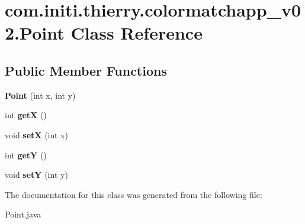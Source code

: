 \hypertarget{classcom_1_1initi_1_1thierry_1_1colormatchapp__v02_1_1_point}{}\section{com.\+initi.\+thierry.\+colormatchapp\+\_\+v02.\+Point Class Reference}
\label{classcom_1_1initi_1_1thierry_1_1colormatchapp__v02_1_1_point}
\subsection*{Public Member Functions}
\begin{DoxyCompactItemize}
\item 
{\bfseries Point} (int x, int y)\hypertarget{classcom_1_1initi_1_1thierry_1_1colormatchapp__v02_1_1_point_aa3031a426c726705b8bad437879c237c}{}\label{classcom_1_1initi_1_1thierry_1_1colormatchapp__v02_1_1_point_aa3031a426c726705b8bad437879c237c}

\item 
int {\bfseries getX} ()\hypertarget{classcom_1_1initi_1_1thierry_1_1colormatchapp__v02_1_1_point_aed6a1c43bf33d5c8cdc4f2132d5fb5fc}{}\label{classcom_1_1initi_1_1thierry_1_1colormatchapp__v02_1_1_point_aed6a1c43bf33d5c8cdc4f2132d5fb5fc}

\item 
void {\bfseries setX} (int x)\hypertarget{classcom_1_1initi_1_1thierry_1_1colormatchapp__v02_1_1_point_a82e48c44fcec1acd6c64b024f3c108fa}{}\label{classcom_1_1initi_1_1thierry_1_1colormatchapp__v02_1_1_point_a82e48c44fcec1acd6c64b024f3c108fa}

\item 
int {\bfseries getY} ()\hypertarget{classcom_1_1initi_1_1thierry_1_1colormatchapp__v02_1_1_point_a19db3dd14c3b2a33caf1ab82c0b6ae19}{}\label{classcom_1_1initi_1_1thierry_1_1colormatchapp__v02_1_1_point_a19db3dd14c3b2a33caf1ab82c0b6ae19}

\item 
void {\bfseries setY} (int y)\hypertarget{classcom_1_1initi_1_1thierry_1_1colormatchapp__v02_1_1_point_a2957093d5bde8cc1ff5e16d2ba9d9335}{}\label{classcom_1_1initi_1_1thierry_1_1colormatchapp__v02_1_1_point_a2957093d5bde8cc1ff5e16d2ba9d9335}

\end{DoxyCompactItemize}


The documentation for this class was generated from the following file\+:\begin{DoxyCompactItemize}
\item 
Point.\+java\end{DoxyCompactItemize}
